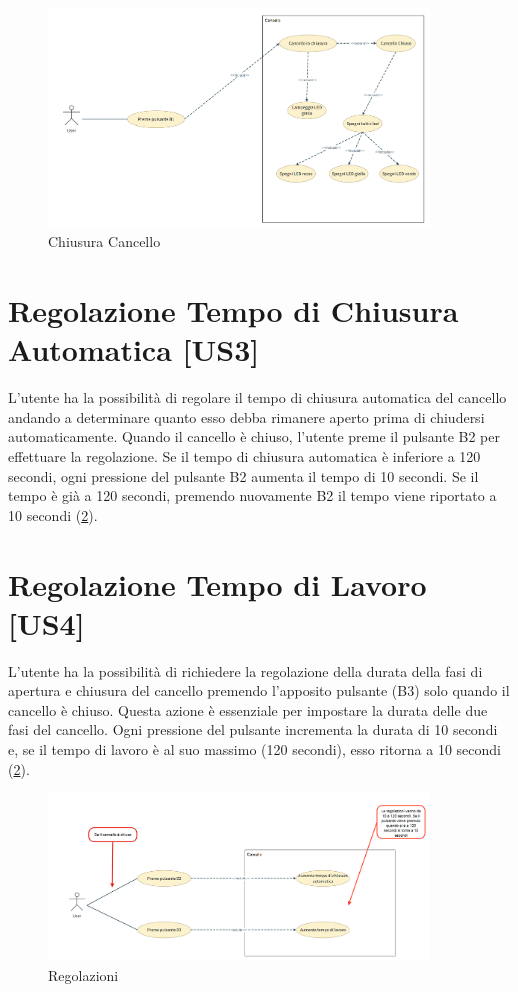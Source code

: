 \begin{figure}[H]
    \centering
    \includegraphics[width=0.9\textwidth]{figures/usecase_2.png}
    \caption{Chiusura Cancello}
    \label{usecase2}
\end{figure}


\section{Regolazione Tempo di Chiusura Automatica [US3]}
L'utente ha la possibilità di regolare il tempo di chiusura automatica del cancello andando a determinare quanto esso debba rimanere aperto prima di chiudersi automaticamente.
Quando il cancello è chiuso, l'utente preme il pulsante B2 per effettuare la regolazione. Se il tempo di chiusura automatica è inferiore a 120 secondi, ogni pressione del pulsante B2 aumenta il tempo di 10 secondi. Se il tempo è già a 120 secondi, premendo nuovamente B2 il tempo viene riportato a 10 secondi (\ref{usecase3}).


\section{Regolazione Tempo di Lavoro [US4]}
L'utente ha la possibilità  di richiedere la regolazione della durata della fasi di apertura e chiusura del cancello premendo l'apposito pulsante (B3) solo quando il cancello è chiuso. Questa azione è essenziale per impostare la durata delle due fasi del cancello. Ogni pressione del pulsante incrementa la durata di 10 secondi e, se il tempo di lavoro è al suo massimo (120 secondi), esso ritorna a 10 secondi (\ref{usecase3}).

\begin{figure}[H]
    \centering
    \includegraphics[width=0.9\textwidth]{figures/usecase_3.png}
    \caption{Regolazioni}
    \label{usecase3}
\end{figure}


